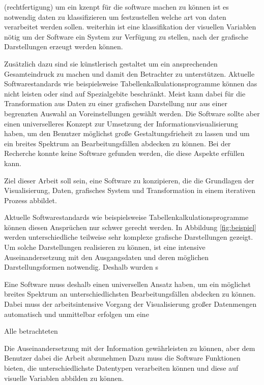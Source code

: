 \documentclass[a4paper, 12pt, DIVcalc, onepage, pdftex, headsepline, footsepline]{scrreprt}
\begin{document}
(rechtfertigung)
um ein kzenpt für die software machen zu können ist es notwendig daten zu klassifizieren um festzustellen
welche art von daten verarbeitet werden sollen. weiterhin ist eine klassifikation der visuellen Variablen nötig
um der Software ein System zur Verfügung zu stellen, nach der grafische Darstellungen erzeugt werden können.


Zusätzlich dazu sind
sie künstlerisch gestaltet um ein ansprechenden Gesamteindruck zu machen und damit den Betrachter zu
unterstützen.
Aktuelle Softwarestandards wie beispielsweise Tabellenkalkulationsprogramme können das nicht leisten
oder sind auf Spezialgebite beschränkt. Meist kann dabei für die Transformation aus Daten zu einer
grafischen Darstellung nur aus einer begrenzten Auswahl an Voreinstellungen gewählt werden.
Die Software sollte aber einen universelleres Konzept zur Umsetzung der Informationsvisualisierung haben, um den Benutzer möglichst große
Gestaltungsfrieheit zu lassen und um ein breites Spektrum an Bearbeitungsfällen abdecken zu können.
Bei der Recherche konnte keine Software gefunden werden, die diese Aspekte erfüllen kann.

Ziel dieser Arbeit soll sein, eine Software zu konzipieren, die die Grundlagen der Visualisierung,
Daten, grafisches System und Transformation in einem iterativen Prozess abbildet.




Aktuelle Softwarestandards wie beispielsweise Tabellenkalkulationsprogramme können diesen Ansprüchen
nur schwer gerecht werden. In Abbildung \ref{fig:beispiel} werden unterschiedliche teilweise
sehr komplexe grafische Darstellungen gezeigt. Um solche Darstellungen realisieren zu können, ist
eine intensive Auseinandersetzung mit den Ausgangsdaten und deren möglichen Darstellungsformen
notwendig. Deshalb wurden s


Eine Software muss deshalb einen universellen Ansatz haben, um ein möglichst breites Spektrum an
unterschiedlichsten Bearbeitungsfällen abdecken zu können. Dabei muss der arbeitsintensive Vorgang
der Visualisierung großer Datenmengen automatisch und unmittelbar erfolgen um eine 





Alle betrachteten



Die Auseinandersetzung mit der Information gewährleisten zu können, aber dem Benutzer dabei die Arbeit abzunehmen 
Dazu muss die Software Funktionen bieten, die unterschiedlichste Datentypen verarbeiten können und diese auf visuelle Variablen
abbilden zu können.
\end{document}
